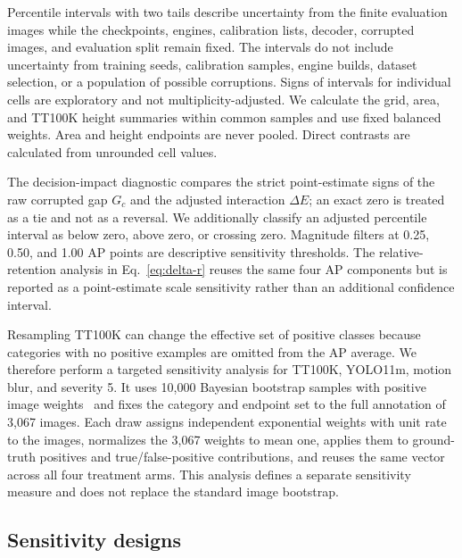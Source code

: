 \documentclass[a4paper,fleqn]{cas-dc}
\begin{document}
Percentile intervals with two tails describe uncertainty from the finite evaluation images while the checkpoints, engines, calibration lists, decoder, corrupted images, and evaluation split remain fixed. The intervals do not include uncertainty from training seeds, calibration samples, engine builds, dataset selection, or a population of possible corruptions. Signs of intervals for individual cells are exploratory and not multiplicity-adjusted. We calculate the grid, area, and TT100K height summaries within common samples and use fixed balanced weights. Area and height endpoints are never pooled. Direct contrasts are calculated from unrounded cell values.

The decision-impact diagnostic compares the strict point-estimate signs of the raw corrupted gap $G_c$ and the adjusted interaction $\Delta E$; an exact zero is treated as a tie and not as a reversal. We additionally classify an adjusted percentile interval as below zero, above zero, or crossing zero. Magnitude filters at 0.25, 0.50, and 1.00 AP points are descriptive sensitivity thresholds. The relative-retention analysis in Eq.~\eqref{eq:delta-r} reuses the same four AP components but is reported as a point-estimate scale sensitivity rather than an additional confidence interval.

Resampling TT100K can change the effective set of positive classes because categories with no positive examples are omitted from the AP average. We therefore perform a targeted sensitivity analysis for TT100K, YOLO11m, motion blur, and severity 5. It uses 10,000 Bayesian bootstrap samples with positive image weights~\citep{rubin1981bayesian} and fixes the category and endpoint set to the full annotation of 3,067 images. Each draw assigns independent exponential weights with unit rate to the images, normalizes the 3,067 weights to mean one, applies them to ground-truth positives and true/false-positive contributions, and reuses the same vector across all four treatment arms. This analysis defines a separate sensitivity measure and does not replace the standard image bootstrap.

\subsection{Sensitivity designs}
\label{sec:sensitivities}
\end{document}
